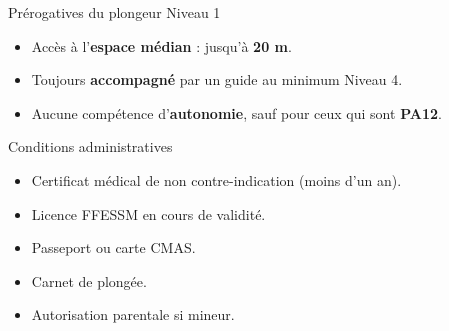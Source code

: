 \begin{frame}{Prérogatives du plongeur Niveau 1}
  \begin{itemize}
    \item Accès à l’\textbf{espace médian} : jusqu’à \textbf{20 m}.
    \item Toujours \textbf{accompagné} par un guide au minimum Niveau 4.
    \item Aucune compétence d’\textbf{autonomie}, sauf pour ceux qui sont \textbf{PA12}.
  \end{itemize}

  \begin{block}{Conditions administratives}
    \begin{itemize}
      \item Certificat médical de non contre-indication (moins d’un an).
      \item Licence FFESSM en cours de validité.
      \item Passeport ou carte CMAS.
      \item Carnet de plongée.
      \item Autorisation parentale si mineur.
    \end{itemize}
  \end{block}
\end{frame}

